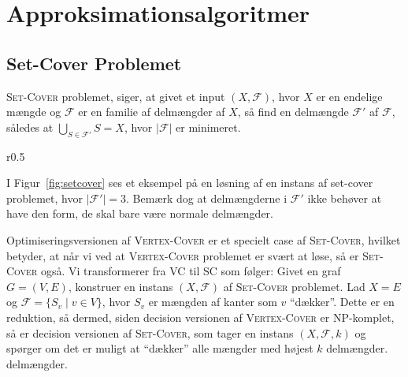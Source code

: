 \chapter{Approksimationsalgoritmer}

\section{Set-Cover Problemet}%
\label{sec:SetCover}

\textsc{Set-Cover} problemet, siger, at givet et input $(X, \mathcal{F})$, hvor $X$ er en endelige mængde og $\mathcal{F}$ er en familie af delmængder af $X$, så find en delmængde $\mathcal{F}'$ af $\mathcal{F}$, således at $\bigcup_{S \in \mathcal{F}'} S = X$, hvor $|\mathcal{F}|$ er minimeret.

\begin{wrapfigure}{r}{0.5\textwidth}
  \centering
  \caption{\label{fig:setcover} Et eksempel på en løsning af et Setcover Problem hvor $|\mathcal{F}'| = 3$}
\end{wrapfigure}

I Figur~\ref{fig:setcover} ses et eksempel på en løsning af en instans af set-cover problemet, hvor $|\mathcal{F}'| = 3$. Bemærk dog at delmængderne i $\mathcal{F}'$ ikke behøver at have den form, de skal bare være normale delmængder.

Optimiseringsversionen af \textsc{Vertex-Cover} er et specielt case af \textsc{Set-Cover}, hvilket betyder, at når vi ved at \textsc{Vertex-Cover} problemet er svært at løse, så er \textsc{Set-Cover} også. Vi transformerer fra \textsc{VC} til \textsc{SC} som følger: Givet en graf $G = (V,E)$, konstruer en instans $(X, \mathcal{F})$ af \textsc{Set-Cover} problemet. Lad $X = E$ og $\mathcal{F} = \{S_{v} \mid v \in V\}$, hvor $S_{v}$ er mængden af kanter som $v$ ``dækker''. Dette er en reduktion, så dermed, siden decision versionen af \textsc{Vertex-Cover} er NP-komplet, så er decision versionen af \textsc{Set-Cover}, som tager en instans $(X, \mathcal{F}, k)$ og spørger om det er muligt at ``dækker'' alle mængder med højest $k$ delmængder. delmængder.

